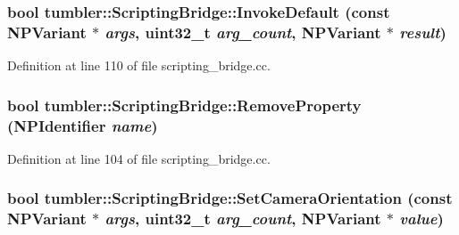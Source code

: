 \hypertarget{classtumbler_1_1_scripting_bridge_abc3713f16c739bb1c547def1afc5c93c}{
\subsubsection[{InvokeDefault}]{\setlength{\rightskip}{0pt plus 5cm}bool tumbler::ScriptingBridge::InvokeDefault (const NPVariant $\ast$ {\em args}, \/  uint32\_\-t {\em arg\_\-count}, \/  NPVariant $\ast$ {\em result})}}
\label{classtumbler_1_1_scripting_bridge_abc3713f16c739bb1c547def1afc5c93c}


Definition at line 110 of file scripting\_\-bridge.cc.

\hypertarget{classtumbler_1_1_scripting_bridge_a58c45c6be183d37e0fa26de95b4410a1}{
\subsubsection[{RemoveProperty}]{\setlength{\rightskip}{0pt plus 5cm}bool tumbler::ScriptingBridge::RemoveProperty (NPIdentifier {\em name})}}
\label{classtumbler_1_1_scripting_bridge_a58c45c6be183d37e0fa26de95b4410a1}


Definition at line 104 of file scripting\_\-bridge.cc.

\hypertarget{classtumbler_1_1_scripting_bridge_a9e3ffd7304dc607ddecad7cb8774009a}{
\subsubsection[{SetCameraOrientation}]{\setlength{\rightskip}{0pt plus 5cm}bool tumbler::ScriptingBridge::SetCameraOrientation (const NPVariant $\ast$ {\em args}, \/  uint32\_\-t {\em arg\_\-count}, \/  NPVariant $\ast$ {\em value})}}
\label{classtumbler_1_1_scripting_bridge_a9e3ffd7304dc607ddecad7cb8774009a}


